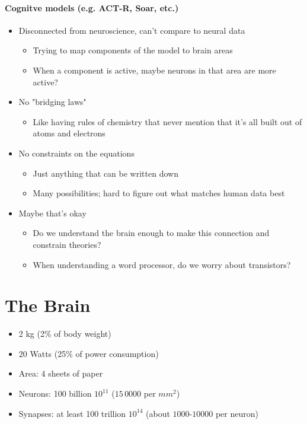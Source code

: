 \documentclass[10pt,letterpaper,oneside]{article}
\begin{document}
\paragraph{Cognitve models (e.g. ACT-R, Soar, etc.)}

\begin{itemize}
	\item Disconnected from neuroscience, can't compare to neural data
	\begin{itemize}
		\item Trying to map components of the model to brain areas
		\item When a component is active, maybe neurons in that area are more active?
	\end{itemize}
	\item No "bridging laws"
	\begin{itemize}
		\item Like having rules of chemistry that never mention that it's all built out of atoms and electrons
	\end{itemize}
	\item No constraints on the equations
	\begin{itemize}
		\item Just anything that can be written down
		\item Many possibilities; hard to figure out what matches human data best
	\end{itemize}
	\item Maybe that's okay
	\begin{itemize}
		\item Do we understand the brain enough to make this connection and constrain theories?
		\item When understanding a word processor, do we worry about transistors?
	\end{itemize}
\end{itemize}

\section{The Brain}

\begin{itemize}
	\item 2 kg (2\% of body weight)
	\item 20 Watts (25\% of power consumption)
	\item Area: 4 sheets of paper
	\item Neurons: 100 billion $10^{11}$ ($15\,0000$ per $mm^2$)
	\item Synapses: at least 100 trillion $10^{14}$ (about $1000$-$10000$ per neuron)
\end{itemize}
\end{document}
